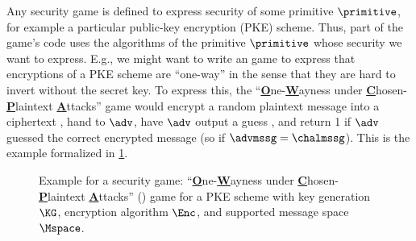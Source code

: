       Any security game is defined to express security of some primitive
        $\primitive$, for example a particular public-key encryption (PKE) scheme.
      	Thus, part of the game's code uses the algorithms of the primitive
        $\primitive$ whose security we want to express.
      	E.g., we might want to write an game to express that encryptions of a PKE scheme \PKE
      	are ``one-way'' in the sense that they are hard to invert without the secret key.
      	To express this, the ``\textbf{\underline{O}}ne-\textbf{\underline{W}}ayness under \textbf{\underline{C}}hosen-\textbf{\underline{P}}laintext \textbf{\underline{A}}ttacks'' game
        \owcpa would encrypt a random plaintext message \chalmssg into a ciphertext \chalctxt,
      	hand \chalctxt to $\adv$,
      	have $\adv$ output a guess \advmssg,
        and return 1 if $\adv$ guessed the correct encrypted message (so if $\advmssg =
        \chalmssg$). This is the example formalized in \cref{fig:example-game}.
        
        \begin{figure}[t]
        	\begin{center}
        	\end{center}
        	\caption{\label{fig:example-game}
        		Example for a security game:
        		``\textbf{\underline{O}}ne-\textbf{\underline{W}}ayness under \textbf{\underline{C}}hosen-\textbf{\underline{P}}laintext \textbf{\underline{A}}ttacks'' (\owcpa) game for
        		a PKE scheme with key generation $\KG$,
        		encryption algorithm $\Enc$, and supported message space $\Mspace$.
        	}
        \end{figure}

